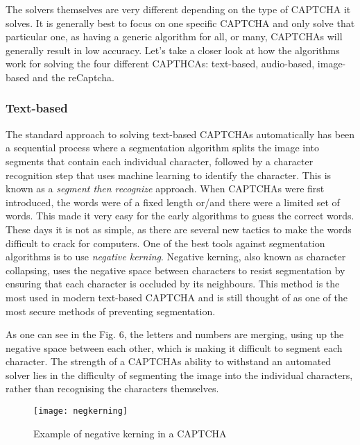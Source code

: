 \documentclass[a4paper]{IEEEtran}
\begin{document}
The solvers themselves are very different depending on the type of CAPTCHA it solves. It is generally best to focus on one specific CAPTCHA and only solve that particular one, as having a generic algorithm for all, or many, CAPTCHAs will generally result in low accuracy. Let's take a closer look at how the algorithms work for solving the four different CAPTHCAs: text-based, audio-based, image-based and the reCaptcha.

\subsubsection{Text-based}
The standard approach to solving text-based CAPTCHAs automatically has been a sequential process where a segmentation algorithm splits the image into segments that contain each individual character, followed by a character recognition step that uses machine learning to identify the character. This is known as a \textit{segment then recognize} approach. When CAPTCHAs were first introduced, the words were of a fixed length or/and there were a limited set of words. This made it very easy for the early algorithms to guess the correct words. These days it is not as simple, as there are several new tactics to make the words difficult to crack for computers. One of the best tools against segmentation algorithms is to use \textit{negative kerning}. Negative kerning, also known as character collapsing, uses the negative space between characters to resist segmentation by ensuring that each character is occluded by its neighbours. This method is the most used in modern text-based CAPTCHA and is still thought of as one of the most secure methods of preventing segmentation. 

As one can see in the Fig. 6, the letters and numbers are merging, using up the negative space between each other, which is making it difficult to segment each character. The strength of a CAPTCHAs ability to withstand an automated solver lies in the difficulty of segmenting the image into the individual characters, rather than recognising the characters themselves. 

\begin{figure}[t]
\centering
\texttt{[image: negkerning]}
\caption[Negative kerning]{Example of negative kerning in a CAPTCHA\cite{negkerning}}
\label{Negative kerning}
\end{figure}
\end{document}
